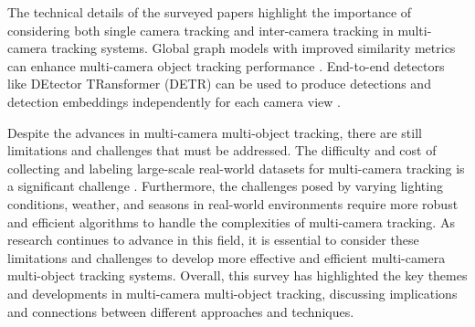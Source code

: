 \documentclass[conference]{IEEEtran}
\begin{document}
The technical details of the surveyed papers highlight the importance of considering both single camera tracking and inter-camera tracking in multi-camera tracking systems. Global graph models with improved similarity metrics can enhance multi-camera object tracking performance \cite{An equalised global graphical model-based approach for multi-camera object tracking}. End-to-end detectors like DEtector TRansformer (DETR) can be used to produce detections and detection embeddings independently for each camera view \cite{MCTR: Multi Camera Tracking Transformer}.

Despite the advances in multi-camera multi-object tracking, there are still limitations and challenges that must be addressed. The difficulty and cost of collecting and labeling large-scale real-world datasets for multi-camera tracking is a significant challenge \cite{MTMMC: A Large-Scale Real-World Multi-Modal Camera Tracking Benchmark}. Furthermore, the challenges posed by varying lighting conditions, weather, and seasons in real-world environments require more robust and efficient algorithms to handle the complexities of multi-camera tracking. As research continues to advance in this field, it is essential to consider these limitations and challenges to develop more effective and efficient multi-camera multi-object tracking systems. Overall, this survey has highlighted the key themes and developments in multi-camera multi-object tracking, discussing implications and connections between different approaches and techniques.
\end{document}
